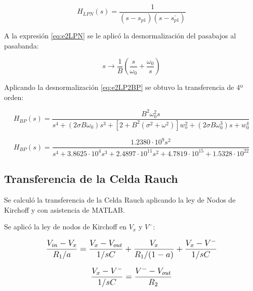 {\begin{equation}
H_{LPN}(s)=\frac{1}{(s-s_{p1})(s-\bar{s_{p1}})}
\label{eq:e2LPN}
\end{equation}

A la expresión \eqref{eq:e2LPN} se le aplicó la desnormalización del pasabajos al pasabanda:

\begin{equation}
s \rightarrow \frac{1}{B}\left(\frac{s}{\omega_0}+\frac{\omega_0}{s}\right)
\label{eq:e2LP2BP}
\end{equation}

Aplicando la desnormalización \eqref{eq:e2LP2BP} se obtuvo la transferencia de 4º orden:

\begin{equation}
H_{BP}(s) = \frac{B^2 \omega_0^2 s}{s^4 + \left(2 \sigma B \omega_0\right) s^3 + \left[ 2+B^2 \left(\sigma^2 + \omega^2 \right) \right] w_o^2 + \left(2 \sigma B \omega_0^3\right) s + w_0^4}
\end{equation}

\begin{equation*}
H_{BP}(s)=\frac{1.2380\cdot10^9s^2}{s^4+3.8625\cdot10^4 s^3+2.4897\cdot10^{11}s^2+4.7819\cdot10^{15}+1.5328\cdot10^{22}}
\end{equation*}

\subsection{Transferencia de la Celda Rauch}

Se calculó la transferencia de la Celda Rauch aplicando la ley de Nodos de Kirchoff y con asistencia de MATLAB.

\begin{figure}[ht]
\begin{center}

\end{center}
\end{figure}

Se aplicó la ley de nodos de Kirchoff en $V_x$ y $V^-$:

\begin{equation}
\mathlarger{
\frac{V_{in}-V_x}{R_1/a}=\frac{V_x-V_{out}}{1/sC}+\frac{V_x}{R_1/(1-a)}+\frac{V_x-V^-}{1/sC}
}
\label{eq:e2vx}
\end{equation}

\begin{equation}
\mathlarger{
\frac{V_x-V^-}{1/sC}=\frac{V^--V_{out}}{R_2}
}
\label{eq:e2v-}
\end{equation}

}
